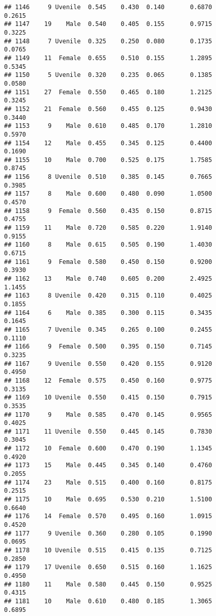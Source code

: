 \documentclass[
]{article}
\begin{document}
\begin{verbatim}
## 1146     9 Uvenile  0.545    0.430  0.140       0.6870         0.2615
## 1147    19    Male  0.540    0.405  0.155       0.9715         0.3225
## 1148     7 Uvenile  0.325    0.250  0.080       0.1735         0.0765
## 1149    11  Female  0.655    0.510  0.155       1.2895         0.5345
## 1150     5 Uvenile  0.320    0.235  0.065       0.1385         0.0580
## 1151    27  Female  0.550    0.465  0.180       1.2125         0.3245
## 1152    21  Female  0.560    0.455  0.125       0.9430         0.3440
## 1153     9    Male  0.610    0.485  0.170       1.2810         0.5970
## 1154    12    Male  0.455    0.345  0.125       0.4400         0.1690
## 1155    10    Male  0.700    0.525  0.175       1.7585         0.8745
## 1156     8 Uvenile  0.510    0.385  0.145       0.7665         0.3985
## 1157     8    Male  0.600    0.480  0.090       1.0500         0.4570
## 1158     9  Female  0.560    0.435  0.150       0.8715         0.4755
## 1159    11    Male  0.720    0.585  0.220       1.9140         0.9155
## 1160     8    Male  0.615    0.505  0.190       1.4030         0.6715
## 1161     9  Female  0.580    0.450  0.150       0.9200         0.3930
## 1162    13    Male  0.740    0.605  0.200       2.4925         1.1455
## 1163     8 Uvenile  0.420    0.315  0.110       0.4025         0.1855
## 1164     6    Male  0.385    0.300  0.115       0.3435         0.1645
## 1165     7 Uvenile  0.345    0.265  0.100       0.2455         0.1110
## 1166     9  Female  0.500    0.395  0.150       0.7145         0.3235
## 1167     9 Uvenile  0.550    0.420  0.155       0.9120         0.4950
## 1168    12  Female  0.575    0.450  0.160       0.9775         0.3135
## 1169    10 Uvenile  0.550    0.415  0.150       0.7915         0.3535
## 1170     9    Male  0.585    0.470  0.145       0.9565         0.4025
## 1171    11 Uvenile  0.550    0.445  0.145       0.7830         0.3045
## 1172    10  Female  0.600    0.470  0.190       1.1345         0.4920
## 1173    15    Male  0.445    0.345  0.140       0.4760         0.2055
## 1174    23    Male  0.515    0.400  0.160       0.8175         0.2515
## 1175    10    Male  0.695    0.530  0.210       1.5100         0.6640
## 1176    14  Female  0.570    0.495  0.160       1.0915         0.4520
## 1177     9 Uvenile  0.360    0.280  0.105       0.1990         0.0695
## 1178    10 Uvenile  0.515    0.415  0.135       0.7125         0.2850
## 1179    17 Uvenile  0.650    0.515  0.160       1.1625         0.4950
## 1180    11    Male  0.580    0.445  0.150       0.9525         0.4315
## 1181    10    Male  0.610    0.480  0.185       1.3065         0.6895

\end{verbatim}
\end{document}
